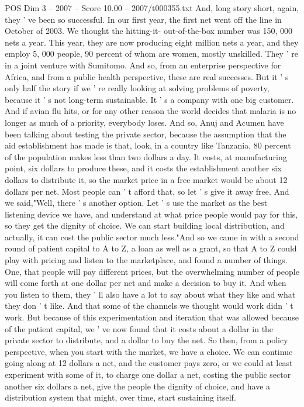 \begin{textsample}{POS Dim 3 – 2007 – Score 10.00 – 2007/t000355.txt}
And, long story short, again, they ' ve been so successful.
In our first year, the first net went off the line in October of 2003.
We thought the hitting-it- out-of-the-box number was 150, 000 nets a year.
This year, they are now producing eight million nets a year, and they employ 5, 000 people, 90 percent of whom are women, mostly unskilled.
They ' re in a joint venture with Sumitomo.
And so, from an enterprise perspective for Africa, and from a public health perspective, these are real successes.
But it ' s only half the story if we ' re really looking at solving problems of poverty, because it ' s not long-term sustainable.
It ' s a company with one big customer.
And if avian flu hits, or for any other reason the world decides that malaria is no longer as much of a priority, everybody loses.
And so, Anuj and Acumen have been talking about testing the private sector, because the assumption that the aid establishment has made is that, look, in a country like Tanzania, 80 percent of the population makes less than two dollars a day.
It costs, at manufacturing point, six dollars to produce these, and it costs the establishment another six dollars to distribute it, so the market price in a free market would be about 12 dollars per net.
Most people can ' t afford that, so let ' s give it away free.
And we said,"Well, there ' s another option.
Let ' s use the market as the best listening device we have, and understand at what price people would pay for this, so they get the dignity of choice.
We can start building local distribution, and actually, it can cost the public sector much less."And so we came in with a second round of patient capital to A to Z, a loan as well as a grant, so that A to Z could play with pricing and listen to the marketplace, and found a number of things.
One, that people will pay different prices, but the overwhelming number of people will come forth at one dollar per net and make a decision to buy it.
And when you listen to them, they ' ll also have a lot to say about what they like and what they don ' t like.
And that some of the channels we thought would work didn ' t work.
But because of this experimentation and iteration that was allowed because of the patient capital, we ' ve now found that it costs about a dollar in the private sector to distribute, and a dollar to buy the net.
So then, from a policy perspective, when you start with the market, we have a choice.
We can continue going along at 12 dollars a net, and the customer pays zero, or we could at least experiment with some of it, to charge one dollar a net, costing the public sector another six dollars a net, give the people the dignity of choice, and have a distribution system that might, over time, start sustaining itself.

\end{textsample}

